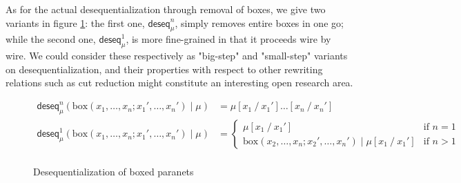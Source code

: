 \documentclass[12pt]{report}
\newcommand{\subst}[3]{#1\left[#2 \mathbin{/} #3\right]}
\begin{document}
As for the actual desequentialization through removal of boxes, we give two variants in figure
\ref{def:deseq-lnets}: the first one, $\mathsf{deseq}^n_μ$, simply removes entire boxes in one go;
while the second one, $\mathsf{deseq}^1_μ$, is more fine-grained in that it proceeds wire by wire.
We could consider these respectively as "big-step" and "small-step" variants on desequentialization,
and their properties with respect to other rewriting relations such as cut reduction might
constitute an interesting open research area.

\begin{figure}[h]
    \begin{align*}
        \mathsf{deseq}_\mu^n(\mathrm{box}(x_1, \ldots, x_n; x_1', \ldots, x_n') ∣ \mu) &=
            \subst{\subst{\mu}{x_1}{x_1'}\ldots}{x_n}{x_n'} \\
        \mathsf{deseq}_\mu^1(\mathrm{box}(x_1, \ldots, x_n; x_1', \ldots, x_n') ∣ \mu) &=
        \begin{cases}
            \subst{\mu}{x_1}{x_1'} & \text{if $n = 1$} \\
            \mathrm{box}(x_2, \ldots, x_n; x_2', \ldots, x_n') ∣ \subst{\mu}{x_1}{x_1'}
            & \text{if $n > 1$}
        \end{cases} \\
    \end{align*}
    \caption[]{Desequentialization of boxed paranets}
    \label{def:deseq-lnets}
\end{figure}
\end{document}

